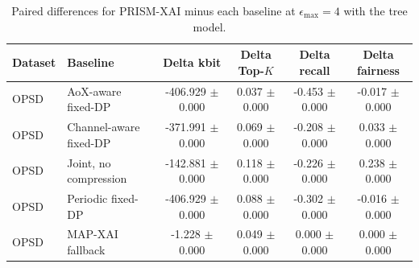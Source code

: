 \begin{table}[t]
\caption{Paired differences for PRISM-XAI minus each baseline at $\epsilon_{\max}=4$ with the tree model.}
\label{tab:paired-differences}
\centering
\scriptsize
\setlength{\tabcolsep}{3pt}
\begin{tabular}{llcccc}
\toprule
Dataset & Baseline & Delta kbit & Delta Top-$K$ & Delta recall & Delta fairness \\
\midrule
OPSD & AoX-aware fixed-DP & -406.929 $\pm$ 0.000 & 0.037 $\pm$ 0.000 & -0.453 $\pm$ 0.000 & -0.017 $\pm$ 0.000 \\
OPSD & Channel-aware fixed-DP & -371.991 $\pm$ 0.000 & 0.069 $\pm$ 0.000 & -0.208 $\pm$ 0.000 & 0.033 $\pm$ 0.000 \\
OPSD & Joint, no compression & -142.881 $\pm$ 0.000 & 0.118 $\pm$ 0.000 & -0.226 $\pm$ 0.000 & 0.238 $\pm$ 0.000 \\
OPSD & Periodic fixed-DP & -406.929 $\pm$ 0.000 & 0.088 $\pm$ 0.000 & -0.302 $\pm$ 0.000 & -0.016 $\pm$ 0.000 \\
OPSD & MAP-XAI fallback & -1.228 $\pm$ 0.000 & 0.049 $\pm$ 0.000 & 0.000 $\pm$ 0.000 & 0.000 $\pm$ 0.000 \\
\bottomrule
\end{tabular}
\end{table}
